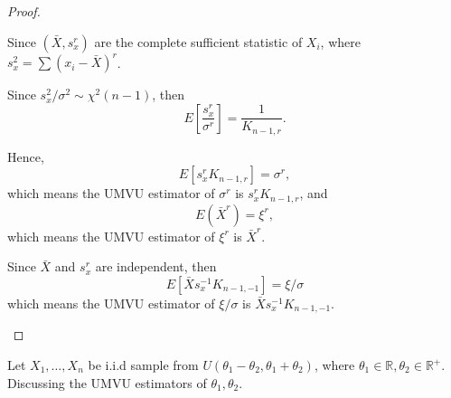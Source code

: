 \begin{proof}
\begin{enumerate}
		      Since $(\bar{X},s_x^r)$ are the complete sufficient statistic of $X_i$, where $s_x^2=\sum\left(x_{i}-\bar{X}\right)^r$.

		      Since $s_x^2/\sigma^2\sim\chi^2(n-1)$, then
		      \begin{equation*}
			      E\left[\frac{s_x^r}{\sigma^r}\right]=\frac{1}{K_{n-1,r}}.
		      \end{equation*}

		      Hence,
		      \begin{equation*}
			      E\left[s_x^rK_{n-1,r}\right]=\sigma^r,
		      \end{equation*}
		      which means the UMVU estimator of $\sigma^r$ is $s_x^rK_{n-1,r}$,
		      and
		      \begin{equation*}
			      E(\bar{X}^r)=\xi^r,
		      \end{equation*}
		      which means the UMVU estimator of $\xi^r$ is $\bar{X}^r$.

		      Since $\bar{X}$ and $s_x^r$ are independent, then
		      \begin{equation*}
			      E[\bar{X}s_x^{-1}K_{n-1,-1}]=\xi/\sigma
		      \end{equation*}
		      which means the UMVU estimator of $\xi/\sigma$ is $\bar{X}s_x^{-1}K_{n-1,-1}$.
	\end{enumerate}
\end{proof}

\begin{example}[]
	Let $X_{1},\ldots,X_{n}$ be i.i.d sample from $U\left(\theta_1-\theta_2,\theta_1+\theta_2\right)$, where $\theta_1\in\mathbb{R},\theta_2\in\mathbb{R}^+$. Discussing the UMVU estimators of $\theta_1,\theta_2$.
\end{example}

